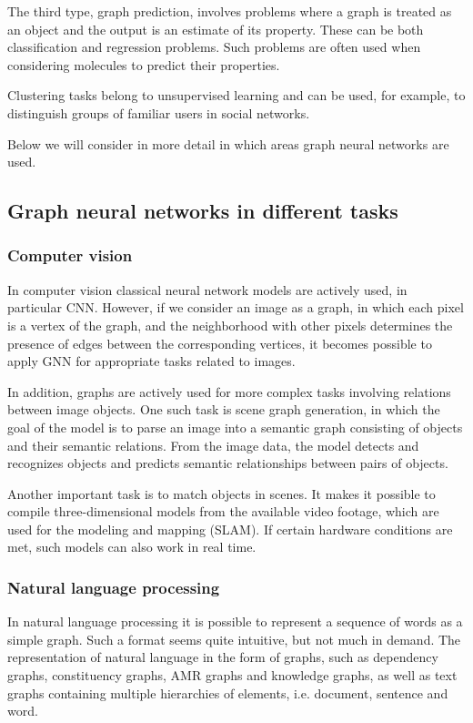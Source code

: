 \documentclass[a4paper,14pt]{article}
\begin{document}
The third type, graph prediction, involves problems where a graph is treated as an object and the output is an estimate of its property. These can be both classification and regression problems. Such problems are often used when considering molecules to predict their properties.

Clustering tasks belong to unsupervised learning and can be used, for example, to distinguish groups of familiar users in social networks.

Below we will consider in more detail in which areas graph neural networks are used.

\subsection{Graph neural networks in different tasks}\label{4}

\subsubsection*{Computer vision}

In computer vision classical neural network models are actively used, in particular CNN. However, if we consider an image as a graph, in which each pixel is a vertex of the graph, and the neighborhood with other pixels determines the presence of edges between the corresponding vertices, it becomes possible to apply GNN for appropriate tasks related to images.

In addition, graphs are actively used for more complex tasks involving relations between image objects.
One such task is scene graph generation, in which the goal of the model is to parse an image into a semantic graph consisting of objects and their semantic relations. From the image data, the model detects and recognizes objects and predicts semantic relationships between pairs of objects.

Another important task is to match objects in scenes. It makes it possible to compile three-dimensional models from the available video footage, which are used for the modeling and mapping (SLAM). If certain hardware conditions are met, such models can also work in real time.

\subsubsection*{Natural language processing}
In natural language processing it is possible to represent a sequence of words as a simple graph. Such a format seems quite intuitive, but not much in demand. The representation of natural language in the form of graphs, such as dependency graphs, constituency graphs, AMR graphs and knowledge graphs, as well as text graphs containing multiple hierarchies of elements, i.e. document, sentence and word.
\end{document}
